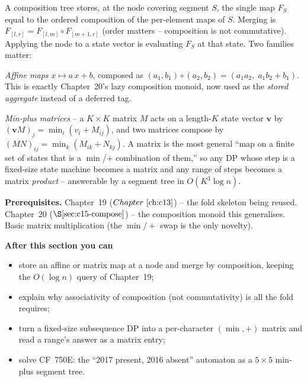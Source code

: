 \begin{topicintro}
A composition tree stores, at the node covering segment \(S\), the single map
\(F_S\) equal to the ordered composition of the per-element maps of \(S\).
Merging is \(F_{[l,r]}=F_{[l,m]}\circ F_{[m+1,r]}\) (order matters -- composition
is not commutative).  Applying the node to a state vector is evaluating \(F_S\)
at that state.  Two families matter:

\emph{Affine maps} \(x\mapsto a\,x+b\), composed as \((a_1,b_1)\circ(a_2,b_2) =
(a_1a_2,\;a_1b_2+b_1)\).  This is exactly Chapter~20's lazy composition monoid,
now used as the \emph{stored aggregate} instead of a deferred tag.

\emph{Min-plus matrices} -- a \(K\times K\) matrix \(M\) acts on a length-\(K\)
state vector \(\mathbf{v}\) by \((\mathbf{v}M)_j=\min_i(v_i+M_{ij})\), and two
matrices compose by \((MN)_{ij}=\min_k(M_{ik}+N_{kj})\).  A matrix is the most
general ``map on a finite set of states that is a \(\min\)/\(+\) combination of
them,'' so any DP whose step is a fixed-size state machine becomes a matrix and
any range of steps becomes a matrix \emph{product} -- answerable by a segment
tree in \(O(K^3\log n)\).

\textbf{Prerequisites.} Chapter~19 (\(\chref{c13}\)) -- the fold skeleton being
reused.  Chapter~20 (\(\secref{c15-compose}\)) -- the composition monoid this
generalises.  Basic matrix multiplication (the \(\min/\!+\) swap is the only
novelty).

\textbf{After this section you can}
\begin{itemize}[nosep]
  \item store an affine or matrix map at a node and merge by composition, keeping
        the \(O(\log n)\) query of Chapter~19; \hfill{}
  \item explain why associativity of composition (not commutativity) is all the
        fold requires; \hfill{}
  \item turn a fixed-size subsequence DP into a per-character \((\min,+)\) matrix
        and read a range's answer as a matrix entry; \hfill{}
  \item solve CF~750E: the ``2017 present, 2016 absent'' automaton as a \(5\times5\)
        min-plus segment tree. \hfill{}
\end{itemize}
\end{topicintro}

